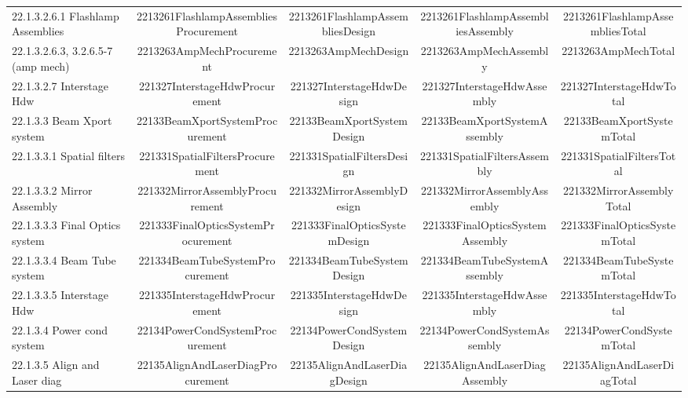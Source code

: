 \begin{table}[h!]
{\begin{tabular}{lcccc}
\hspace{15mm}22.1.3.2.6.1 Flashlamp Assemblies & 2213261FlashlampAssembliesProcurement & 2213261FlashlampAssembliesDesign & 2213261FlashlampAssembliesAssembly & 2213261FlashlampAssembliesTotal \\
\hspace{15mm}22.1.3.2.6.3, 3.2.6.5-7 (amp mech) & 2213263AmpMechProcurement & 2213263AmpMechDesign & 2213263AmpMechAssembly & 2213263AmpMechTotal \\
\hspace{10mm}22.1.3.2.7 Interstage Hdw & 221327InterstageHdwProcurement & 221327InterstageHdwDesign & 221327InterstageHdwAssembly & 221327InterstageHdwTotal \\
\hspace{5mm}22.1.3.3 Beam Xport system & 22133BeamXportSystemProcurement & 22133BeamXportSystemDesign & 22133BeamXportSystemAssembly & 22133BeamXportSystemTotal \\
\hspace{10mm}22.1.3.3.1 Spatial filters & 221331SpatialFiltersProcurement & 221331SpatialFiltersDesign & 221331SpatialFiltersAssembly & 221331SpatialFiltersTotal \\
\hspace{10mm}22.1.3.3.2 Mirror Assembly & 221332MirrorAssemblyProcurement & 221332MirrorAssemblyDesign & 221332MirrorAssemblyAssembly & 221332MirrorAssemblyTotal \\
\hspace{10mm}22.1.3.3.3 Final Optics system & 221333FinalOpticsSystemProcurement & 221333FinalOpticsSystemDesign & 221333FinalOpticsSystemAssembly & 221333FinalOpticsSystemTotal \\
\hspace{10mm}22.1.3.3.4 Beam Tube system & 221334BeamTubeSystemProcurement & 221334BeamTubeSystemDesign & 221334BeamTubeSystemAssembly & 221334BeamTubeSystemTotal \\
\hspace{10mm}22.1.3.3.5 Interstage Hdw & 221335InterstageHdwProcurement & 221335InterstageHdwDesign & 221335InterstageHdwAssembly & 221335InterstageHdwTotal \\
\hspace{5mm}22.1.3.4 Power cond system & 22134PowerCondSystemProcurement & 22134PowerCondSystemDesign & 22134PowerCondSystemAssembly & 22134PowerCondSystemTotal \\
\hspace{5mm}22.1.3.5 Align and Laser diag & 22135AlignAndLaserDiagProcurement & 22135AlignAndLaserDiagDesign & 22135AlignAndLaserDiagAssembly & 22135AlignAndLaserDiagTotal \\

\end{tabular}}
\end{table}
